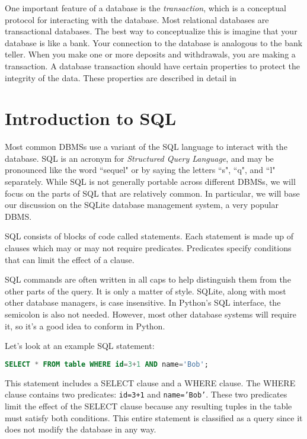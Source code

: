 One important feature of a database is the \emph{transaction}, which is a conceptual protocol for
interacting with the database.
Most relational databases are transactional databases.
The best way to conceptualize this is imagine that your database is like a bank.
Your connection to the database is analogous to the bank teller.
When you make one or more deposits and withdrawals, you are making a transaction.
A database transaction should have certain properties to protect the integrity of the data.
These properties are described in detail in 

\section*{Introduction to SQL}
Most common DBMSs use a variant of the SQL language to interact with the database.
SQL is an acronym for \emph{Structured Query Language}, and may be pronounced like the word ``sequel" or by saying
the letters ``s", ``q", and ``l" separately.
While SQL is not generally portable across different DBMSs, we will focus on the parts of SQL that are relatively common.
In particular, we will base our discussion on the SQLite database management system, a very popular DBMS.

SQL consists of blocks of code called statements.
Each statement is made up of clauses which may or may not require predicates.
Predicates specify conditions that can limit the effect of a clause.

\begin{info}
SQL commands are often written in all caps to help distinguish them from the other parts of the query.
It is only a matter of style.
SQLite, along with most other database managers, is case insensitive.
In Python's SQL interface, the semicolon is also not needed.
However, most other database systems will require it, so it's a good idea to conform in Python.
\end{info}

Let's look at an example SQL statement:
\begin{lstlisting}[language=SQL]
SELECT * FROM table WHERE id=3+1 AND name='Bob';
\end{lstlisting}
This statement includes a SELECT clause and a WHERE clause.
The WHERE clause contains two predicates: \texttt{id=3+1} and \texttt{name='Bob'}.
These two predicates limit the effect of the SELECT clause because any resulting tuples in the table must satisfy both conditions.
This entire statement is classified as a query since it does not modify the database in any way.

